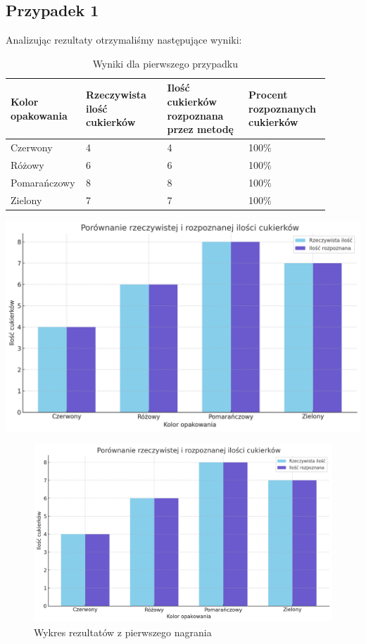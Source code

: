 \documentclass{article}
\begin{document}
\subsection{Przypadek 1}
Analizując rezultaty otrzymaliśmy następujące wyniki:

\begin{table}
\centering
\label{tab:video1}
\begin{tabular}{|p{0.15\linewidth}|p{0.25\linewidth}|p{0.25\linewidth}|p{0.25\linewidth}|}
 \hline
 Kolor opakowania & Rzeczywista ilość cukierków & Ilość cukierków rozpoznana przez metodę & Procent rozpoznanych cukierków \\
 \hline
 Czerwony & 4 & 4 & 100\% \\
 \hline
 Różowy & 6 & 6 & 100\% \\
 \hline
 Pomarańczowy & 8 & 8 & 100\% \\
 \hline
 Zielony & 7 & 7 & 100\% \\
 \hline
\end{tabular}
\caption{Wyniki dla pierwszego przypadku}
\end{table}

\begin{center}
\includegraphics[width=\linewidth]{wykres1.png}
\end{center}

\begin{figure}[H]
    \centering
    \includegraphics[width=\linewidth]{wykres1.png}
    \caption{Wykres rezultatów z pierwszego nagrania}
    \label{fig:ukladPomiarowy}
\end{figure}
\end{document}
